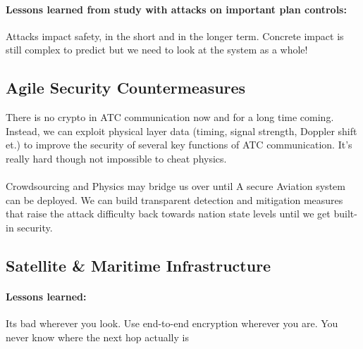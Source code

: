 \paragraph{Lessons learned from study with attacks on important plan controls:}
Attacks impact safety, in the short and in the longer term. Concrete impact is still complex to predict but we need to look at the system as a whole!

\subsection{Agile Security Countermeasures}
There is no crypto in ATC communication now and for a long time coming.
Instead, we can exploit physical layer data (timing, signal strength, Doppler shift et.) to improve the security of several key functions of ATC communication. It's really hard though not impossible to cheat physics.\\
\\
Crowdsourcing and Physics may bridge us over until A secure Aviation system can be deployed.
We can build transparent detection and mitigation measures that raise the attack difficulty back towards nation state levels until we get built-in security.

\subsection{Satellite \& Maritime Infrastructure}

\paragraph{Lessons learned:}
Its bad wherever you look. Use end-to-end encryption wherever you are. You never know where the next hop actually is
